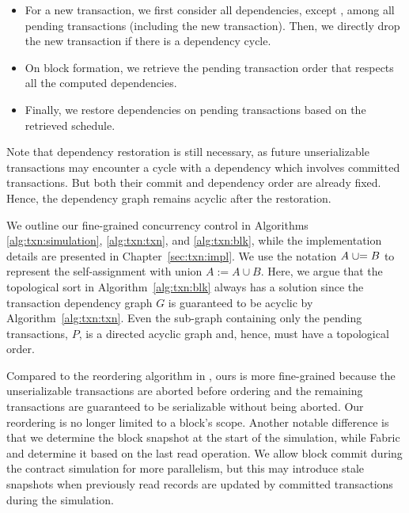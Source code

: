 \begin{itemize}

\item For a new transaction, we first consider all dependencies, except
  , among all pending transactions (including the new
  transaction).
  Then, we directly drop the new transaction if there is a dependency cycle.

\item On block formation, we retrieve the pending transaction order that
  respects all the computed dependencies.

\item Finally, we restore  dependencies on pending transactions
  based on the retrieved schedule.

\end{itemize}

Note that  dependency restoration is still necessary, 
%
as future unserializable transactions may encounter a cycle with a 
dependency which involves committed transactions. 
%
But both their commit and dependency order are already fixed.
%
Hence, the dependency graph remains acyclic after the restoration.

We outline our fine-grained concurrency control in Algorithms \ref{alg:txn:simulation}, \ref{alg:txn:txn}, and \ref{alg:txn:blk}, while the implementation details are presented in Chapter~\ref{sec:txn:impl}.
%
We use the notation $A \mathrel{{\cup}{=}} B$ to represent the self-assignment with union $A := A \cup B$.
%
Here, we argue that the topological sort in Algorithm~\ref{alg:txn:blk} always has a solution
since the transaction dependency graph $G$ is guaranteed to be acyclic by Algorithm~\ref{alg:txn:txn}.
%
Even the sub-graph containing only the pending transactions, $P$, is a directed
acyclic graph and, hence, must have a topological order.

Compared to the reordering algorithm in {\fabricPlusplus}, ours is more fine-grained
because the unserializable transactions are aborted before ordering and the
remaining transactions are guaranteed to be serializable without being aborted.
%
Our reordering is no longer limited to a block's scope.
Another notable difference is that we determine the block snapshot at the start
of the simulation, while Fabric and {\fabricPlusplus} determine it based on the last read
operation.
%
We allow block commit during the contract simulation for more
parallelism, but this may introduce stale snapshots when previously read records
are updated by committed transactions during the simulation.

